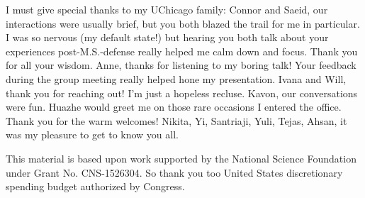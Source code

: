 I must give special thanks to my UChicago family: Connor and Saeid, our
interactions were usually brief, but you both blazed the trail for me in
particular. I was so nervous (my default state!) but hearing you both talk about
your experiences post-M.S.-defense really helped me calm down and focus. Thank
you for all your wisdom. Anne, thanks for listening to my boring talk! Your
feedback during the group meeting really helped hone my presentation. Ivana and
Will, thank you for reaching out! I'm just a hopeless recluse. Kavon, our
conversations were fun. Huazhe would greet me on those rare occasions I entered
the office. Thank you for the warm welcomes! Nikita, Yi, Santriaji, Yuli, Tejas,
Ahsan, it was my pleasure to get to know you all.

This material is based upon work supported by the National Science Foundation
under Grant No. CNS-1526304. So thank you too United States discretionary
spending budget authorized by Congress.
